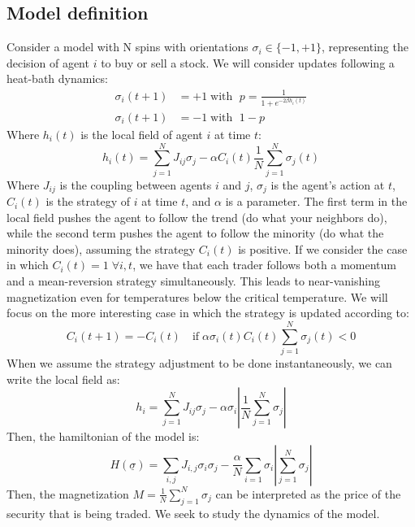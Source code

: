 \subsection{Model definition}
Consider a model with N spins with orientations $\sigma_i\in\{-1,+1\}$, representing the decision of agent $i$ to buy or sell a stock. We will consider updates following a heat-bath dynamics:
\begin{equation}
    \begin{aligned}
        \sigma_i(t+1) &= +1 \;\text{with }\; p = \frac{1}{1+e^{-2\beta h_i(t)}}\\
        \sigma_i(t+1) &= -1 \;\text{with }\; 1-p
    \end{aligned}
    \label{eq:heat_bath}
\end{equation}
Where $h_i(t)$ is the local field of agent $i$ at time $t$:
\begin{equation}
    h_i(t)=\sum_{j=1}^N J_{i j} \sigma_j-\alpha C_i(t) \frac{1}{N} \sum_{j=1}^N \sigma_j(t)
\end{equation}
Where $J_{i j}$ is the coupling between agents $i$ and $j$, $\sigma_j$ is the agent's action at $t$, $C_i(t)$ is the strategy of $i$ at time $t$, and $\alpha$ is a parameter. The first term in the local field pushes the agent to follow the trend (do what your neighbors do), while the second term pushes the agent to follow the minority (do what the minority does), assuming the strategy $C_i(t)$ is positive. 
If we consider the case in which $C_i(t) = 1\;\forall i, t$, we have that each trader follows both a momentum and a mean-reversion strategy simultaneously. This leads to near-vanishing magnetization even for temperatures below the critical temperature. We will focus on the more interesting case in which the strategy is updated according to:
\begin{equation}
    C_i(t+1) = -C_i(t) \quad\text{if} \; \alpha\sigma_i(t)C_i(t) \sum_{j=1}^N \sigma_j(t)< 0
\end{equation}
When we assume the strategy adjustment to be done instantaneously, we can write the local field as:
\begin{equation}
    h_i=\sum_{j=1}^N J_{i j} \sigma_j-\alpha \sigma_i \left | \frac{1}{N}\sum_{j=1}^N \sigma_j \right |
\end{equation}
Then, the hamiltonian of the model is:
\begin{equation}
    H(\underline{\sigma}) = \sum_{i,j}J_{i,j}\sigma_i\sigma_j - \frac{\alpha}{N}\sum_{i=1} \sigma_i \left | \sum_{j=1}^N \sigma_j \right |
\end{equation}
Then, the magnetization \(M = \frac{1}{N}\sum_{j=1}^N \sigma_j\) can be interpreted as the price of the security that is being traded. We seek to study the dynamics of the model.

